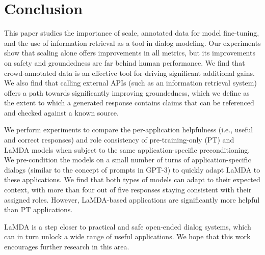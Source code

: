 \section{Conclusion}
This paper studies the importance of scale, annotated data for model fine-tuning, and the use of information retrieval as a tool in dialog modeling. Our experiments show that scaling alone offers improvements in all metrics, but its improvements on safety and groundedness are far behind human performance. We find that crowd-annotated data is an effective tool for driving significant additional gains. We also find that calling external APIs (such as an information retrieval system) offers a path towards significantly improving groundedness, which we define as the extent to which a generated response contains claims that can be referenced and checked against a known source.

We perform experiments to compare the per-application helpfulness (i.e., useful and correct responses) and role consistency of pre-training-only (PT) and LaMDA models when subject to the same application-specific preconditioning. We pre-condition the models on a small number of turns of application-specific dialogs (similar to the concept of prompts in GPT-3) to quickly adapt LaMDA to these applications. We find that both types of models can adapt to their expected context, with more than four out of five responses staying consistent with their assigned roles. However, LaMDA-based applications are significantly more helpful than PT applications.

LaMDA is a step closer to practical and safe open-ended dialog systems, which can in turn unlock a wide range of useful applications. We hope that this work encourages further research in this area.


